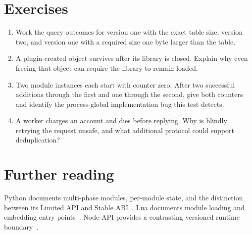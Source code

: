 \section{Exercises}
\label{sec:ch75-exercises}
\begin{enumerate}
\item\label{ex:ch75-version} Work the query outcomes for version one with the exact table size, version two, and version one with a required size one byte larger than the table.
\item\label{ex:ch75-unload} A plugin-created object survives after its library is closed.
Explain why even freeing that object can require the library to remain loaded.
\item\label{ex:ch75-state} Two module instances each start with counter zero.
After two successful additions through the first and one through the second, give both counters and identify the process-global implementation bug this test detects.
\item\label{ex:ch75-retry} A worker charges an account and dies before replying.
Why is blindly retrying the request unsafe, and what additional protocol could support deduplication?
\end{enumerate}

\section{Further reading}
\label{sec:ch75-reading}
Python documents multi-phase modules, per-module state, and the distinction between its Limited API and Stable ABI~\cite{python-2026-capi}.
Lua documents module loading and embedding entry points~\cite{ierusalimschy-2026-lua}.
Node-API provides a contrasting versioned runtime boundary~\cite{node-2026-api}.
